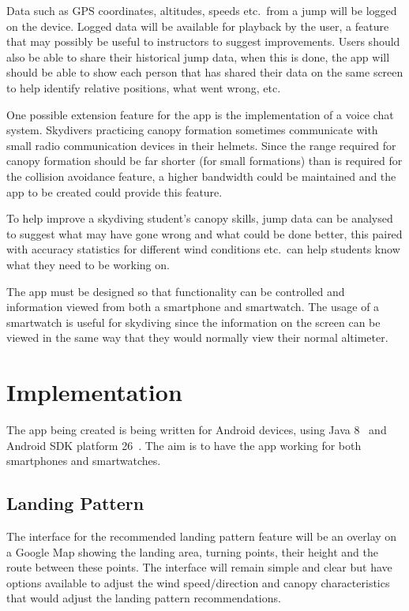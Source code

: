 \documentclass[11pt, a4paper, twocolumn]{article}
\begin{document}
Data such as GPS coordinates, altitudes, speeds etc.\ from a jump will be logged on the device. Logged data will be available for playback by the user, a feature that may possibly be useful to instructors to suggest improvements. Users should also be able to share their historical jump data, when this is done, the app will should be able to show each person that has shared their data on the same screen to help identify relative positions, what went wrong, etc.

One possible extension feature for the app is the implementation of a voice chat system. Skydivers practicing canopy formation sometimes communicate with small radio communication devices in their helmets. Since the range required for canopy formation should be far shorter (for small formations) than is required for the collision avoidance feature, a higher bandwidth could be maintained and the app to be created could provide this feature.

To help improve a skydiving student's canopy skills, jump data can be analysed to suggest what may have gone wrong and what could be done better, this paired with accuracy statistics for different wind conditions etc.\ can help students know what they need to be working on.

The app must be designed so that functionality can be controlled and information viewed from both a smartphone and smartwatch. The usage of a smartwatch is useful for skydiving since the information on the screen can be viewed in the same way that they would normally view their normal altimeter.

\section{Implementation}\label{sec:implementation} %
The app being created is being written for Android devices, using Java 8~\cite{noauthor_java_nodate} and Android SDK platform 26~\cite{noauthor_download_nodate}. The aim is to have the app working for both smartphones and smartwatches.

\subsection{Landing Pattern} %
The interface for the recommended landing pattern feature will be an overlay on a Google Map showing the landing area, turning points, their height and the route between these points. The interface will remain simple and clear but have options available to adjust the wind speed/direction and canopy characteristics that would adjust the landing pattern recommendations.
\end{document}
